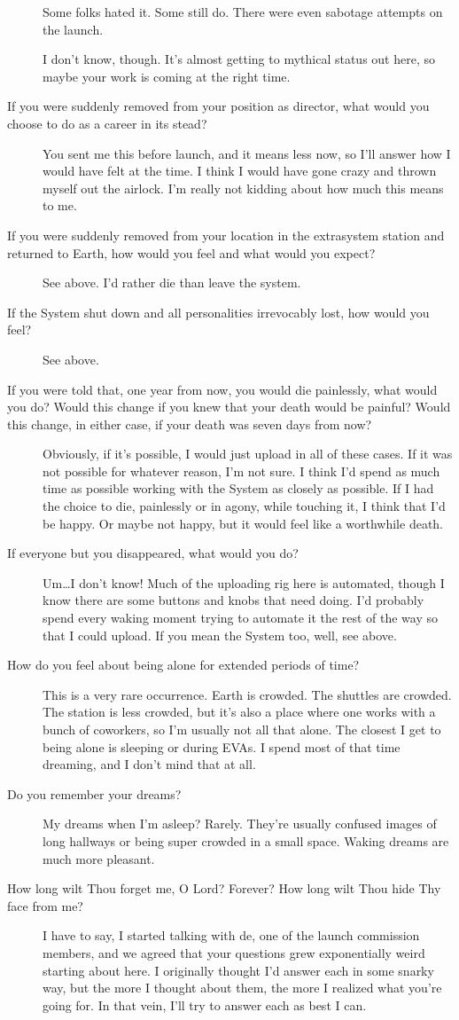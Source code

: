 \begin{description}
Some folks hated it. Some still do. There were even sabotage attempts on the launch.

I don't know, though. It's almost getting to mythical status out here, so maybe your work is coming at the right time.
\item[If you were suddenly removed from your position as director, what would you choose to do as a career in its stead?]
You sent me this before launch, and it means less now, so I'll answer how I would have felt at the time. I think I would have gone crazy and thrown myself out the airlock. I'm really not kidding about how much this means to me.
\item[If you were suddenly removed from your location in the extrasystem station and returned to Earth, how would you feel and what would you expect?]
See above. I'd rather die than leave the system.
\item[If the System shut down and all personalities irrevocably lost, how would you feel?]
See above.
\item[If you were told that, one year from now, you would die painlessly, what would you do? Would this change if you knew that your death would be painful? Would this change, in either case, if your death was seven days from now?]
Obviously, if it's possible, I would just upload in all of these cases. If it was not possible for whatever reason, I'm not sure. I think I'd spend as much time as possible working with the System as closely as possible. If I had the choice to die, painlessly or in agony, while touching it, I think that I'd be happy. Or maybe not happy, but it would feel like a worthwhile death.
\item[If everyone but you disappeared, what would you do?]
Um\ldots I don't know! Much of the uploading rig here is automated, though I know there are some buttons and knobs that need doing. I'd probably spend every waking moment trying to automate it the rest of the way so that I could upload. If you mean the System too, well, see above.
\item[How do you feel about being alone for extended periods of time?]
This is a very rare occurrence. Earth is crowded. The shuttles are crowded. The station is less crowded, but it's also a place where one works with a bunch of coworkers, so I'm usually not all that alone. The closest I get to being alone is sleeping or during EVAs. I spend most of that time dreaming, and I don't mind that at all.
\item[Do you remember your dreams?]
My dreams when I'm asleep? Rarely. They're usually confused images of long hallways or being super crowded in a small space. Waking dreams are much more pleasant.
\item[How long wilt Thou forget me, O Lord? Forever? How long wilt Thou hide Thy face from me?]
I have to say, I started talking with de, one of the launch commission members, and we agreed that your questions grew exponentially weird starting about here. I originally thought I'd answer each in some snarky way, but the more I thought about them, the more I realized what you're going for. In that vein, I'll try to answer each as best I can.


\end{description}
